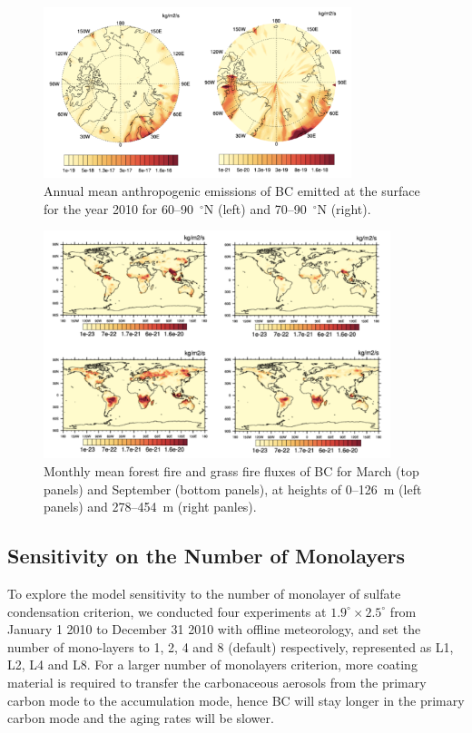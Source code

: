 \documentclass[12pt]{article}
\begin{document}
		\begin{figure}[H] 
			\begin{center}
				\includegraphics[width = 0.8\textwidth]{Figure11}
				\caption[]{\label{fig_P11} Annual mean anthropogenic emissions of BC emitted at the surface for the year 2010 for 60--90~$^\circ$N (left) and 70--90~$^\circ$N (right).}
			\end{center}
		\end{figure}
		\begin{figure}[H] 
			\begin{center}
				\includegraphics[width = 0.9\textwidth]{Figure12}
				\caption[]{\label{fig_P12} Monthly mean forest fire and grass fire fluxes of BC for March (top panels) and September (bottom panels), at heights of 0--126~m (left panels) and 278--454~m (right panles).}
			\end{center}
		\end{figure}
		
	
	\subsection{Sensitivity on the Number of Monolayers}{\label{sec_1}}
	To explore the model sensitivity to the number of monolayer of sulfate condensation criterion, we conducted four experiments at $1.9^\circ \times 2.5^\circ$ from January 1 2010 to December 31 2010 with offline meteorology, and set the number of mono-layers to 1, 2, 4 and 8 (default) respectively, represented as L1, L2, L4 and L8.	For a larger number of monolayers criterion, more coating material is required to transfer the carbonaceous aerosols from the primary carbon mode to the accumulation mode, hence BC will stay longer in the primary carbon mode and the aging rates will be slower.
\end{document}
